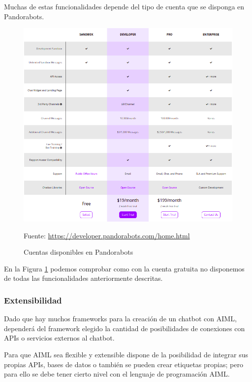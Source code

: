 Muchas de estas funcionalidades depende del tipo de cuenta que se disponga en Pandorabots.

\newpage

\begin{figure}[h]
\centering
\includegraphics[width=1.0\textwidth]{imagenes/02_EstadoDelArte/cuentas_pandorabots.png}
\begin{center}
Fuente: \url{https://developer.pandorabots.com/home.html}
\end{center}
\caption{Cuentas disponibles en Pandorabots}
\label{fig:cuenta_pandorabots}
\end{figure}

En la Figura \ref{fig:cuenta_pandorabots} podemos comprobar como con la cuenta gratuita no disponemos de todas las funcionalidades anteriormente descritas.

\subsubsection*{Extensibilidad}

Dado que hay muchos \glspl{framework} para la creación de un chatbot con AIML, dependerá del \gls{framework} elegido la cantidad de posibilidades de conexiones con \glspl{API} o servicios externos al chatbot.

Para que AIML sea flexible y extensible dispone de la posibilidad de integrar sus propias \glspl{API}, bases de datos o también se pueden crear etiquetas propias; pero para ello se debe tener cierto nivel con el lenguaje de programación AIML.

